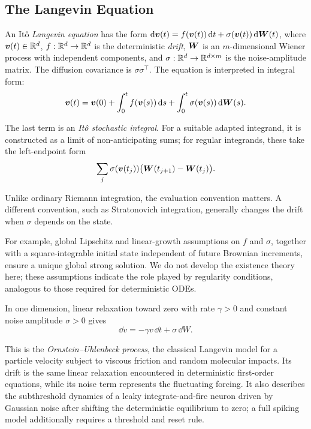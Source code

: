 

\subsection{The Langevin Equation}

\begin{definition}
\label{def:langevin-equation}
An It\^o \emph{Langevin equation} has the form $\mathrm{d}\bm{v}(t)=f(\bm{v}(t))\,\mathrm{d} t+\sigma(\bm{v}(t))\,\mathrm{d}\bm{W}(t)$, where $\bm{v}(t)\in\mathbb{R}^d$, $f:\mathbb{R}^d\to\mathbb{R}^d$ is the deterministic \emph{drift}, $\bm{W}$ is an $m$-dimensional Wiener process with independent components, and $\sigma:\mathbb{R}^d\to\mathbb{R}^{d\times m}$ is the noise-amplitude matrix. The diffusion covariance is $\sigma\sigma^{\top}$. The equation is interpreted in integral form:
\begin{equation}
\bm{v}(t)=\bm{v}(0)+\int_0^t f(\bm{v}(s))\,\mathrm{d} s
+\int_0^t\sigma(\bm{v}(s))\,\mathrm{d}\bm{W}(s).
\end{equation}

The last term is an \emph{It\^o stochastic integral}. For a suitable adapted integrand, it is constructed as a limit of non-anticipating sums; for regular integrands, these take the left-endpoint form
\[
\sum_j\sigma(\bm{v}(t_j))\big(\bm{W}(t_{j+1})-\bm{W}(t_j)\big).
\]

Unlike ordinary Riemann integration, the evaluation convention matters. A different convention, such as Stratonovich integration, generally changes the drift when $\sigma$ depends on the state.
\end{definition}

For example, global Lipschitz and linear-growth assumptions on $f$ and $\sigma$, together with a square-integrable initial state independent of future Brownian increments, ensure a unique global strong solution. We do not develop the existence theory here; these assumptions indicate the role played by regularity conditions, analogous to those required for deterministic ODEs.

\begin{example}
\label{ex:ornstein-uhlenbeck}
In one dimension, linear relaxation toward zero with rate $\gamma>0$ and constant noise amplitude $\sigma>0$ gives
\begin{equation}
\dd v=-\gamma v\,\dd t+\sigma\,\dd W.
\end{equation}

This is the \emph{Ornstein--Uhlenbeck process}, the classical Langevin model for a particle velocity subject to viscous friction and random molecular impacts. Its drift is the same linear relaxation encountered in deterministic first-order equations, while its noise term represents the fluctuating forcing. It also describes the subthreshold dynamics of a leaky integrate-and-fire neuron driven by Gaussian noise after shifting the deterministic equilibrium to zero; a full spiking model additionally requires a threshold and reset rule.
\end{example}

